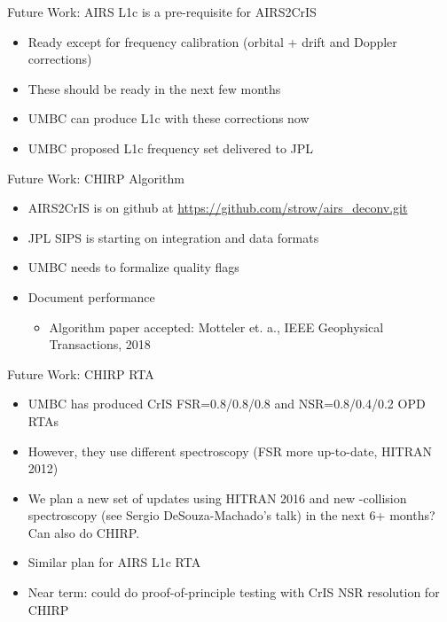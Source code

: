 \documentclass[10pt,t]{beamer}
\begin{document}
\begin{frame}[label={sec:org8b2f8d3}]{Future Work: AIRS L1c is a pre-requisite for AIRS2CrIS}
\begin{itemize}
\item Ready except for frequency calibration (orbital + drift and Doppler corrections)
\item These should be ready in the next few months
\item UMBC can produce L1c with these corrections now
\item UMBC proposed L1c frequency set delivered to JPL
\end{itemize}
\end{frame}
\begin{frame}[label={sec:orgc35fe0a}]{Future Work: CHIRP Algorithm}
\begin{itemize}
\item AIRS2CrIS is on github at \url{https://github.com/strow/airs\_deconv.git}
\item JPL SIPS is starting on integration and data formats
\item UMBC needs to formalize quality flags
\item Document performance 
\begin{itemize}
\item Algorithm paper accepted: Motteler et. a., IEEE Geophysical Transactions, 2018
\end{itemize}
\end{itemize}
\end{frame}
\begin{frame}[label={sec:org3219f94}]{Future Work: CHIRP RTA}
\begin{itemize}
\item UMBC has produced CrIS FSR=0.8/0.8/0.8 and NSR=0.8/0.4/0.2 OPD RTAs
\item However, they use different spectroscopy (FSR more up-to-date, HITRAN 2012)
\item We plan a new set of updates using HITRAN 2016 and new \cd-\water collision spectroscopy (see Sergio DeSouza-Machado's talk) in the next 6+ months?  Can also do CHIRP.
\item Similar plan for AIRS L1c RTA
\item Near term: could do proof-of-principle testing with CrIS NSR resolution for CHIRP
\end{itemize}
\end{frame}
\end{document}
